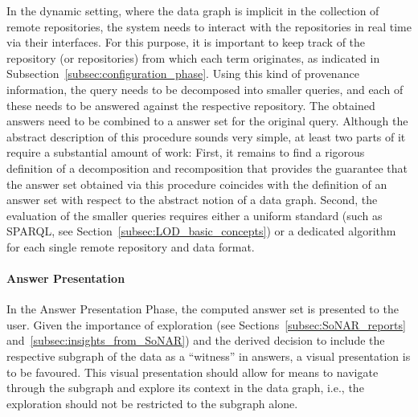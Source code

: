 In the dynamic setting, where the data graph is implicit in the collection of remote repositories,
the system needs to interact with the repositories in real time via their interfaces.
For this purpose, it is important to keep track of the repository (or repositories)
from which each term originates, as indicated in Subsection~\ref{subsec:configuration_phase}.
Using this kind of provenance information, the query needs to be decomposed into
smaller queries, and each of these needs to be answered against the respective repository.
The obtained answers need to be combined to a answer set for the original query.
Although the abstract description of this procedure sounds very simple,
at least two parts of it require a substantial amount of work:
First, it remains to find a rigorous definition of a decomposition and recomposition
that provides the guarantee that the answer set obtained via this procedure 
coincides with the definition of an answer set with respect to the abstract notion
of a data graph.
Second, the evaluation of the smaller queries
requires either a uniform standard (such as \gls{SPARQL}, see Section~\ref{subsec:LOD_basic_concepts})
or a dedicated algorithm for each single remote repository and data format.
%
%

\paragraph{Answer Presentation}

In the Answer Presentation Phase, the computed answer set is presented to the user.
Given the importance of exploration (see Sections~\ref{subsec:SoNAR_reports} and~\ref{subsec:insights_from_SoNAR})
and the derived decision to include the respective subgraph of the data as a \enquote{witness} in answers,
a visual presentation is to be favoured. This visual presentation should allow for means to navigate through the subgraph
and explore its context in the data graph, i.e., the exploration should not be restricted to the subgraph alone.

